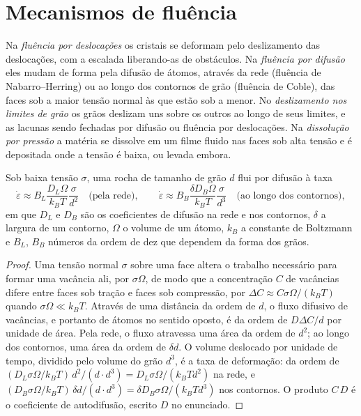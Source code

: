 \section{Mecanismos de fluência}

\begin{definition}\label{def:b3:deformation-mechanisms:creep}
Na \emph{fluência por deslocações} os cristais se deformam pelo
deslizamento das deslocações, com a escalada liberando-as de obstáculos. Na
\emph{fluência por difusão} eles mudam de forma pela
difusão de átomos, através da rede (fluência de Nabarro--Herring) ou ao longo dos
contornos de grão (fluência de Coble), das faces sob a maior tensão normal
às que estão sob a menor. No \emph{deslizamento nos limites de grão}
os grãos deslizam uns sobre os outros ao longo de seus limites, e as lacunas sendo
fechadas por difusão ou fluência por deslocações. Na \emph{dissolução por
pressão} a matéria se dissolve em um filme fluido nas
faces sob alta tensão e é depositada onde a tensão é baixa, ou levada
embora.
\end{definition}

\begin{proposition}\label{prop:b3:deformation-mechanisms:grain-size}
Sob baixa tensão $\sigma$, uma rocha de tamanho de grão $d$ flui por difusão à taxa
\[
  \dot\varepsilon \approx B_L\frac{D_L\Omega}{k_BT}\frac{\sigma}{d^2}
  \quad\text{(pela rede)},\qquad
  \dot\varepsilon \approx B_B\frac{\delta D_B\Omega}{k_BT}\frac{\sigma}{d^3}
  \quad\text{(ao longo dos contornos)},
\]
em que $D_L$ e $D_B$ são os coeficientes de difusão na rede e nos
contornos, $\delta$ a largura de um contorno, $\Omega$ o volume de um átomo,
$k_B$ a constante de Boltzmann e $B_L$, $B_B$ números da ordem de dez que dependem da
forma dos grãos.
\end{proposition}

\begin{proof}
Uma tensão normal $\sigma$ sobre uma face altera o trabalho necessário para formar uma vacância
ali, por $\sigma\Omega$, de modo que a concentração $C$ de vacâncias difere entre
faces sob tração e faces sob compressão, por $\Delta C \approx C\sigma\Omega/
(k_BT)$ quando $\sigma\Omega \ll k_BT$. Através de uma distância da ordem de $d$, o
fluxo difusivo de vacâncias, e portanto de átomos no sentido oposto, é da ordem de $D\Delta
C/d$ por unidade de área. Pela rede, o fluxo atravessa uma área da ordem de
$d^2$; ao longo dos contornos, uma área da ordem de $\delta d$. O volume deslocado por
unidade de tempo, dividido pelo volume do grão $d^3$, é a taxa de deformação: da ordem de
$(D_L\sigma\Omega/k_BT)\,d^2/(d\cdot d^3) = D_L\sigma\Omega/(k_BTd^2)$ na
rede, e $(D_B\sigma\Omega/k_BT)\,\delta d/(d\cdot d^3) = \delta D_B
\sigma\Omega/(k_BTd^3)$ nos contornos. O produto $C\,D$ é o
coeficiente de autodifusão, escrito $D$ no enunciado.
\end{proof}

